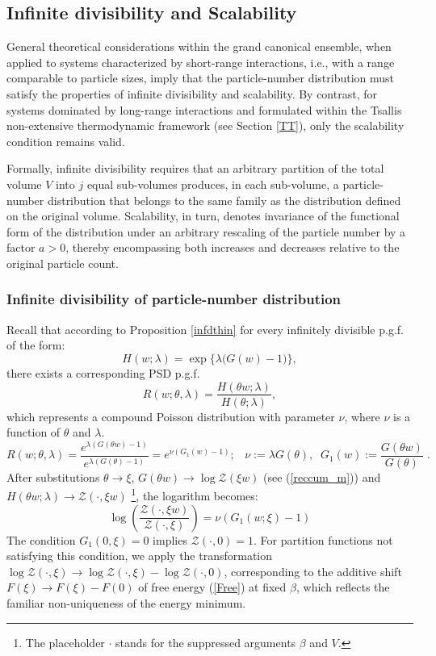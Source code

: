 \documentclass[a4paper,12pt]{amsart}
\theoremstyle{definition}
\theoremstyle{remark}
\begin{document}
\subsection{Infinite divisibility and Scalability} \label{infdscal}

General theoretical considerations within the grand canonical ensemble, when applied to systems characterized by short-range interactions, i.e., with a range comparable to particle sizes, imply that the particle-number distribution must satisfy the properties of infinite divisibility and scalability. By contrast, for systems dominated by long-range interactions and formulated within the Tsallis non-extensive thermodynamic framework (see Section \ref{TT}), only the scalability condition remains valid.

Formally, infinite divisibility requires that an arbitrary partition of the total volume $V$ into $j$ equal sub-volumes produces, in each sub-volume, a particle-number distribution that belongs to the same family as the distribution defined on the original volume. Scalability, in turn, denotes invariance of the functional form of the distribution under an arbitrary rescaling of the particle number by a factor $a>0$, thereby encompassing both increases and decreases relative to the original particle count.
\subsubsection{Infinite divisibility of particle-number distribution}
Recall that according to Proposition \ref{infdthin} for every infinitely divisible p.g.f. of the form:
\[
H(w;\lambda)=\exp\bigl\{\lambda\bigl(G(w)-1\bigr)\bigr\},
\]
there exists a corresponding PSD p.g.f.
\[
R(w;\theta,\lambda)=\frac{H(\theta w;\lambda)}{H(\theta;\lambda)},
\]
which represents a compound Poisson distribution with parameter $\nu$, where $\nu$ is a function of $\theta$ and $\lambda$.
\begin{equation}\label{PSDfromCPD1}
 R(w;\theta,\lambda)
 =\frac{e^{\lambda (G(\theta  w)-1)}}{e^{\lambda (G(\theta )-1)}}=e^{\nu ( G_1(w)-1)};\;\;\;
 \nu:=\lambda G(\theta),\;\; G_1(w):=\frac{G(\theta w)}{G(\theta)}\;.
\end{equation}
After substitutions  $\theta\to\xi$, $G(\theta w) \to \log \mathcal{Z}(\xi w)$ (see (\ref{reccum_m}))  and $H(\theta w;\lambda) \to \mathcal{Z}(\cdot,\xi w)$ \footnote{The placeholder $\cdot$ stands for the suppressed arguments  $\beta$ and $V$.}, the logarithm becomes:
\begin{equation}
\log\left(\frac{\mathcal{Z}(\cdot,\xi w)}{\mathcal{Z}(\cdot ,\xi)}\right)=\nu(G_1(w;\xi)-1)
\end{equation}
The condition  $G_1(0,\xi)=0$ implies $\mathcal{Z}(\cdot,0)=1$. For partition functions not satisfying this condition, we apply the transformation $\log \mathcal{Z}(\cdot,\xi)\to \log \mathcal{Z}(\cdot,\xi)-\log \mathcal{Z}(\cdot, 0)$, corresponding to the additive shift  $F(\xi)\to F(\xi)-F(0)$ of free energy (\ref{Free}) at fixed $\beta$, which reflects the familiar non-uniqueness of the energy minimum.
\end{document}
